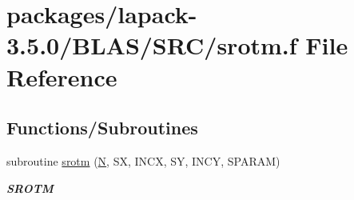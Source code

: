 \hypertarget{lapack-3_85_80_2BLAS_2SRC_2srotm_8f}{}\section{packages/lapack-\/3.5.0/\+B\+L\+A\+S/\+S\+R\+C/srotm.f File Reference}
\label{lapack-3_85_80_2BLAS_2SRC_2srotm_8f}
\subsection*{Functions/\+Subroutines}
\begin{DoxyCompactItemize}
\item 
subroutine \hyperlink{group__single__blas__level1_ga5633344a5729b4f0167aa441dcf95a9c}{srotm} (\hyperlink{polmisc_8c_a0240ac851181b84ac374872dc5434ee4}{N}, S\+X, I\+N\+C\+X, S\+Y, I\+N\+C\+Y, S\+P\+A\+R\+A\+M)
\begin{DoxyCompactList}\small\item\em {\bfseries S\+R\+O\+T\+M} \end{DoxyCompactList}\end{DoxyCompactItemize}
